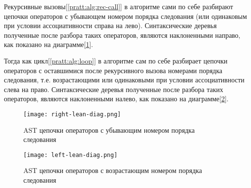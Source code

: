 Рекурсивные вызовы[\ref{pratt:alg:rec-call}] в алгоритме сами по себе разбирают цепочки операторов с убывающем номером порядка следования
(или одинаковым при условии ассоциативности справа на лево). 
Синтаксические деревья полученные после разбора таких операторов, являются наклоненными направо, как показано на диаграмме[\ref{pratt:right-lean-diag}].

Тогда как цикл[\ref{pratt:alg:loop}] в алгоритме сам по себе разбирает цепочки операторов с оставшимися после рекурсивного вызова номерами порядка следования, 
т.е. возрастающими или одинаковыми при условии ассоциативности слева на право. 
Синтаксические деревья полученные после разбора таких операторов, являются наклоненными налево, как показано на диаграмме[\ref{pratt:left-lean-diag}].





\begin{figure}[h!]
    \texttt{[image: right-lean-diag.png]}
    \centering
    \caption{AST цепочки операторов с убывающим номером порядка следования}
    \label{pratt:right-lean-diag}
\end{figure}
\begin{figure}[h!]
    \texttt{[image: left-lean-diag.png]}
    \centering
    \caption{AST цепочки операторов с возрастающим номером порядка следования}
    \label{pratt:left-lean-diag}
\end{figure}

